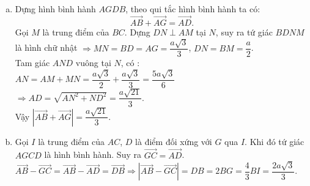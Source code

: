 \begin{bt}
{\begin{center}
\begin{tikzpicture}[>=stealth,line join=round,line cap=round,font=\footnotesize,scale=1]
			\end{tikzpicture}
		\end{center}
		\begin{enumerate}[a)]
			\item
				Dựng hình bình hành $AGDB$, theo qui tắc hình bình hành ta có:
				\[\overrightarrow{AB}+\overrightarrow{AG}=\overrightarrow{AD}.\]
				Gọi $M$ là trung điểm của $BC$. Dựng $DN\perp AM$ tại $N$, suy ra tứ giác $BDNM$ là hình chữ nhật $\Rightarrow MN=BD=AG=\dfrac{a\sqrt{3}}{3}$, $DN=BM=\dfrac{a}{2}$.\\
				Tam giác $AND$ vuông tại $N$, có : \\
				$AN=AM+MN=\dfrac{a\sqrt{3}}{2}+\dfrac{a\sqrt{3}}{3}=\dfrac{5a\sqrt{3}}{6}$\\
				$\Rightarrow AD=\sqrt{AN^2+ND^2}=\dfrac{a\sqrt{21}}{3}$.\\
				Vậy $\left|\overrightarrow{AB}+\overrightarrow{AG}\right|=\dfrac{a\sqrt{21}}{3}$.
			\item Gọi $I$ là trung điểm của $AC$, $D$ là điểm đối xứng với $G$ qua $I$. Khi đó tứ giác $AGCD$ là hình bình hành. Suy ra $\overrightarrow{GC}=\overrightarrow{AD}$.\\
			$\overrightarrow{AB}-\overrightarrow{GC}=\overrightarrow{AB}-\overrightarrow{AD}=\overrightarrow{DB}\Rightarrow\left|\overrightarrow{AB}-\overrightarrow{GC}\right|=DB=2BG=\dfrac{4}{3}BI=\dfrac{2a\sqrt 3}{3}$.
		\end{enumerate}
		
	}
\end{bt}

